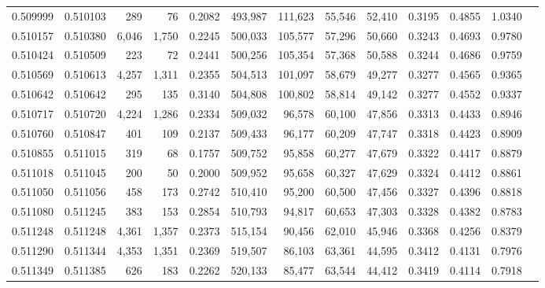 \begin{tabular}{rrrrrrrrrrrrr}
0.509999 & 0.510103 &   289 &    76 &                                     0.2082 & 493,987 & 111,623 &  55,546 &  52,410 & 0.3195 & 0.4855 & 1.0340 \\
0.510157 & 0.510380 & 6,046 & 1,750 &                                     0.2245 & 500,033 & 105,577 &  57,296 &  50,660 & 0.3243 & 0.4693 & 0.9780 \\
0.510424 & 0.510509 &   223 &    72 &                                     0.2441 & 500,256 & 105,354 &  57,368 &  50,588 & 0.3244 & 0.4686 & 0.9759 \\
0.510569 & 0.510613 & 4,257 & 1,311 &                                     0.2355 & 504,513 & 101,097 &  58,679 &  49,277 & 0.3277 & 0.4565 & 0.9365 \\
0.510642 & 0.510642 &   295 &   135 &                                     0.3140 & 504,808 & 100,802 &  58,814 &  49,142 & 0.3277 & 0.4552 & 0.9337 \\
0.510717 & 0.510720 & 4,224 & 1,286 &                                     0.2334 & 509,032 &  96,578 &  60,100 &  47,856 & 0.3313 & 0.4433 & 0.8946 \\
0.510760 & 0.510847 &   401 &   109 &                                     0.2137 & 509,433 &  96,177 &  60,209 &  47,747 & 0.3318 & 0.4423 & 0.8909 \\
0.510855 & 0.511015 &   319 &    68 &                                     0.1757 & 509,752 &  95,858 &  60,277 &  47,679 & 0.3322 & 0.4417 & 0.8879 \\
0.511018 & 0.511045 &   200 &    50 &                                     0.2000 & 509,952 &  95,658 &  60,327 &  47,629 & 0.3324 & 0.4412 & 0.8861 \\
0.511050 & 0.511056 &   458 &   173 &                                     0.2742 & 510,410 &  95,200 &  60,500 &  47,456 & 0.3327 & 0.4396 & 0.8818 \\
0.511080 & 0.511245 &   383 &   153 &                                     0.2854 & 510,793 &  94,817 &  60,653 &  47,303 & 0.3328 & 0.4382 & 0.8783 \\
0.511248 & 0.511248 & 4,361 & 1,357 &                                     0.2373 & 515,154 &  90,456 &  62,010 &  45,946 & 0.3368 & 0.4256 & 0.8379 \\
0.511290 & 0.511344 & 4,353 & 1,351 &                                     0.2369 & 519,507 &  86,103 &  63,361 &  44,595 & 0.3412 & 0.4131 & 0.7976 \\
0.511349 & 0.511385 &   626 &   183 &                                     0.2262 & 520,133 &  85,477 &  63,544 &  44,412 & 0.3419 & 0.4114 & 0.7918 \\

\end{tabular}
